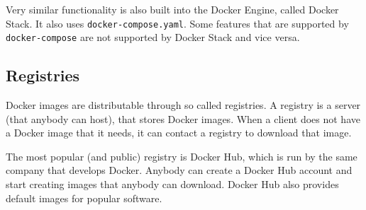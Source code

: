 Very similar functionality is also built into the Docker Engine, called Docker Stack. It also uses \lstinline{docker-compose.yaml}. Some features that are supported by \lstinline{docker-compose} are not supported by Docker Stack and vice versa.

\subsection{Registries}

Docker images are distributable through so called registries. A registry is a server (that anybody can host), that stores Docker images. When a client does not have a Docker image that it needs, it can contact a registry to download that image.

\hfill

The most popular (and public) registry is Docker Hub, which is run by the same company that develops Docker.
Anybody can create a Docker Hub account and start creating images that anybody can download. Docker Hub also provides default images for popular software.
